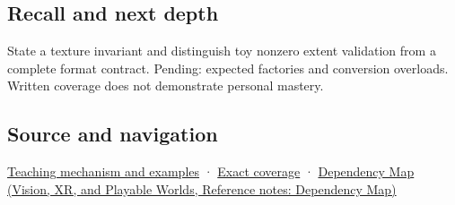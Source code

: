 \subsection{Recall and next depth}\label{appendix-7f8ec83d0886-recall-and-next-depth}

State a texture invariant and distinguish toy nonzero extent validation from a complete format contract. Pending: expected factories and conversion overloads. Written coverage does not demonstrate personal mastery.

\subsection{Source and navigation}\label{appendix-7f8ec83d0886-source-and-navigation}

\hyperref[01-foundations-i-ch003-construction-establishes-a-usable-state]{Teaching mechanism and examples} · \hyperref[appendix-fd090d982a15-m009---parts-127-147]{Exact coverage} · \href{../07-Vision-XR-and-Playable-Worlds/main.pdf\#nameddest=appendix-4ad47bdd269a}{Dependency Map (Vision, XR, and Playable Worlds, Reference notes: Dependency Map)}
